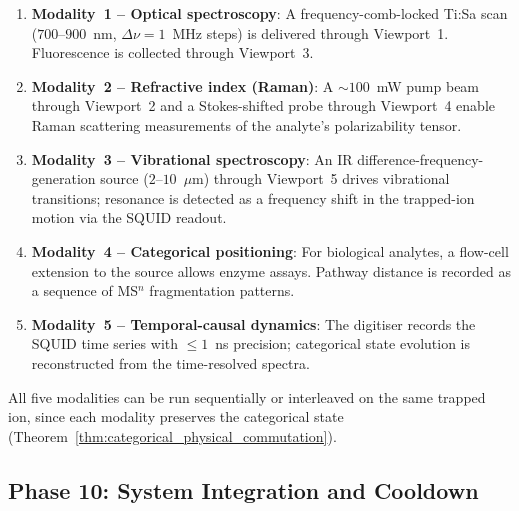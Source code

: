 \begin{enumerate}[leftmargin=1.5em]
    \item \textbf{Modality~1 -- Optical spectroscopy}: A frequency-comb-locked Ti:Sa scan ($700$--$900$~nm, $\Delta\nu = 1$~MHz steps) is delivered through Viewport~1. Fluorescence is collected through Viewport~3.
    \item \textbf{Modality~2 -- Refractive index (Raman)}: A $\sim 100$~mW pump beam through Viewport~2 and a Stokes-shifted probe through Viewport~4 enable Raman scattering measurements of the analyte's polarizability tensor.
    \item \textbf{Modality~3 -- Vibrational spectroscopy}: An IR difference-frequency-generation source ($2$--$10$~$\mu$m) through Viewport~5 drives vibrational transitions; resonance is detected as a frequency shift in the trapped-ion motion via the SQUID readout.
    \item \textbf{Modality~4 -- Categorical positioning}: For biological analytes, a flow-cell extension to the source allows enzyme assays. Pathway distance is recorded as a sequence of MS$^n$ fragmentation patterns.
    \item \textbf{Modality~5 -- Temporal-causal dynamics}: The digitiser records the SQUID time series with $\le 1$~ns precision; categorical state evolution is reconstructed from the time-resolved spectra.
\end{enumerate}

All five modalities can be run sequentially or interleaved on the same trapped ion, since each modality preserves the categorical state (Theorem~\ref{thm:categorical_physical_commutation}).

\subsection{Phase 10: System Integration and Cooldown}
\label{subsec:phase10_integration}

